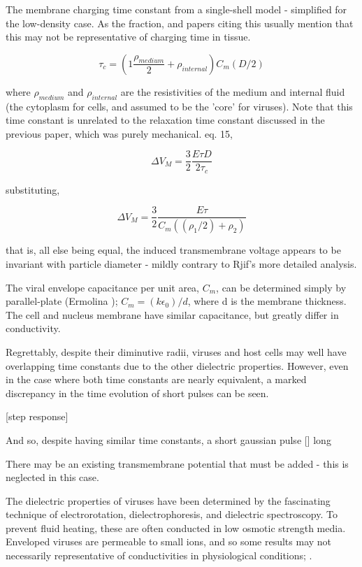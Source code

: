 \documentclass[fleqn,10pt]{paper}
\begin{document}
The membrane charging time constant from a single-shell model \cite{Ultrashort2004} - simplified for the low-density case. As the fraction, and papers citing this usually mention that this may not be representative of charging time in tissue.

$$\tau_c = \left(1 \frac{\rho_{medium}}{2} + \rho_{internal}\right) C_m (D/2)$$

where $\rho_{medium}$ and $\rho_{internal}$ are the resistivities of the medium and internal fluid (the cytoplasm for cells, and assumed to be the 'core' for viruses). Note that this time constant is unrelated to the relaxation time constant discussed in the previous paper, which was purely mechanical. \cite{Bioelectric2007} eq. 15, 

$$\Delta V_M = \frac{3}{2}\frac{E\tau D}{2 \tau_c }$$

substituting,

$$\Delta V_M = \frac{3}{2}\frac{E \tau}{C_m ((\rho_1/2) + \rho_2)}$$

that is, all else being equal, the induced transmembrane voltage appears to be invariant with particle diameter - mildly contrary to Rjif's more detailed analysis.

The viral envelope capacitance per unit area, $C_m$, can be determined simply by parallel-plate (Ermolina \cite{Study2001}); $C_m = (k\epsilon_0) / d$, where d is the membrane thickness. The cell and nucleus membrane have similar capacitance, but greatly differ in conductivity. 

Regrettably, despite their diminutive radii, viruses and host cells may well have overlapping time constants due to the other dielectric properties. However, even in the case where both time constants are nearly equivalent, a marked discrepancy in the time evolution of short pulses can be seen.

[step response]

And so, despite having similar time constants, a short gaussian pulse [] long 


There may be an existing transmembrane potential that must be added - this is neglected in this case.

The dielectric properties of viruses have been determined by the fascinating technique of electrorotation, dielectrophoresis, and dielectric spectroscopy. To prevent fluid heating, these are often conducted in low osmotic strength media. Enveloped viruses are permeable to small ions, and so some results may not necessarily representative of conductivities in physiological conditions; \cite{Assessment}.
\end{document}
